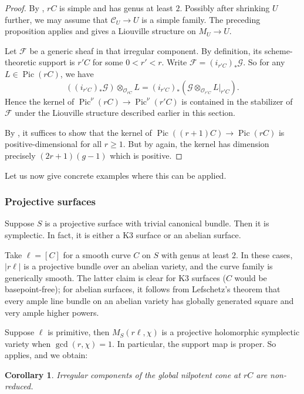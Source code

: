 \documentclass{amsart}
\theoremstyle{plain}
\newtheorem{corollary}[theorem]{Corollary}
\theoremstyle{definition}
\theoremstyle{remark}
\begin{document}
\begin{proof}
    By , $rC$ is simple and has genus at least $2$.
    Possibly after shrinking $U$ further, we may assume that $\mathcal C_U\to U$ is a simple family.
    The preceding proposition applies and gives a Liouville structure on $M_U\to U$.

    Let $\mathcal F$ be a generic sheaf in that irregular component.
    By definition, its scheme-theoretic support is $r'C$ for some $0<r'<r$.
    Write $\mathcal F=(i_{r'C})_\ast\mathcal G$.
    So for any $L\in\operatorname{Pic}(rC)$, we have
    \[((i_{r'C})_\ast\mathcal G)\otimes_{\mathcal O_{rC}} L=(i_{r'C})_\ast(\mathcal G\otimes_{\mathcal O_{r'C}} L|_{r'C}).\]
    Hence the kernel of $\operatorname{Pic}^\nu(rC)\to\operatorname{Pic}^\nu(r'C)$ is contained in the stabilizer of $\mathcal F$ under the Liouville structure described earlier in this section.

    By , it suffices to show that the kernel of $\operatorname{Pic}((r+1)C)\to\operatorname{Pic}(rC)$ is positive-dimensional for all $r\ge 1$.
    But by  again, the kernel has dimension precisely $(2r+1)(g-1)$ which is positive.
\end{proof}
Let us now give concrete examples where this can be applied.
\subsubsection{Projective surfaces}
Suppose $S$ is a projective surface with trivial canonical bundle.
Then it is symplectic.
In fact, it is either a K3 surface or an abelian surface.

Take $\ell=[C]$ for a smooth curve $C$ on $S$ with genus at least $2$.
In these cases, $|r\ell|$ is a projective bundle over an abelian variety, and the curve family is generically smooth.
The latter claim is clear for K3 surfaces ($C$ would be basepoint-free); for abelian surfaces, it follows from Lefschetz's theorem that every ample line bundle on an abelian variety has globally generated square and very ample higher powers.

Suppose $\ell$ is primitive, then $M_S(r\ell,\chi)$ is a projective holomorphic symplectic variety when $\gcd(r,\chi)=1$.
In particular, the support map is proper.
So  applies, and we obtain:
\begin{corollary}\label{k3:irreg_nonred}
    Irregular components of the global nilpotent cone at $rC$ are non-reduced.
\end{corollary}
\end{document}
